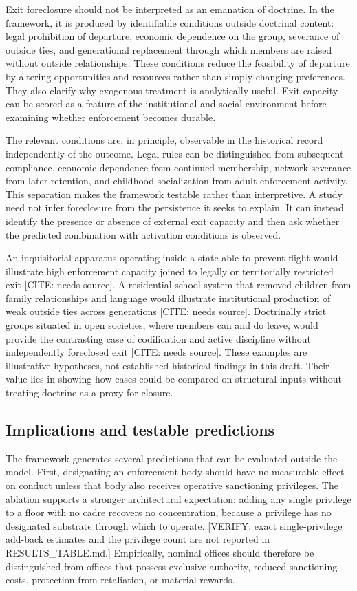 Exit foreclosure should not be interpreted as an emanation of doctrine. In the framework, it is produced by identifiable conditions outside doctrinal content: legal prohibition of departure, economic dependence on the group, severance of outside ties, and generational replacement through which members are raised without outside relationships. These conditions reduce the feasibility of departure by altering opportunities and resources rather than simply changing preferences. They also clarify why exogenous treatment is analytically useful. Exit capacity can be scored as a feature of the institutional and social environment before examining whether enforcement becomes durable.

The relevant conditions are, in principle, observable in the historical record independently of the outcome. Legal rules can be distinguished from subsequent compliance, economic dependence from continued membership, network severance from later retention, and childhood socialization from adult enforcement activity. This separation makes the framework testable rather than interpretive. A study need not infer foreclosure from the persistence it seeks to explain. It can instead identify the presence or absence of external exit capacity and then ask whether the predicted combination with activation conditions is observed.

An inquisitorial apparatus operating inside a state able to prevent flight would illustrate high enforcement capacity joined to legally or territorially restricted exit [CITE: needs source]. A residential-school system that removed children from family relationships and language would illustrate institutional production of weak outside ties across generations [CITE: needs source]. Doctrinally strict groups situated in open societies, where members can and do leave, would provide the contrasting case of codification and active discipline without independently foreclosed exit [CITE: needs source]. These examples are illustrative hypotheses, not established historical findings in this draft. Their value lies in showing how cases could be compared on structural inputs without treating doctrine as a proxy for closure.

\subsection{Implications and testable predictions}

The framework generates several predictions that can be evaluated outside the model. First, designating an enforcement body should have no measurable effect on conduct unless that body also receives operative sanctioning privileges. The ablation supports a stronger architectural expectation: adding any single privilege to a floor with no cadre recovers no concentration, because a privilege has no designated substrate through which to operate. [VERIFY: exact single-privilege add-back estimates and the privilege count are not reported in RESULTS_TABLE.md.] Empirically, nominal offices should therefore be distinguished from offices that possess exclusive authority, reduced sanctioning costs, protection from retaliation, or material rewards.

